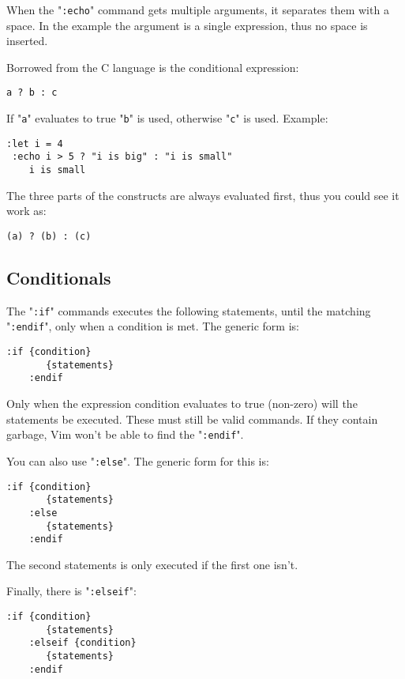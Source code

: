 When the "\verb!:echo!" command gets multiple arguments, it separates them with a space.
In the example the argument is a single expression, thus no space is inserted.

Borrowed from the C language is the conditional expression:

\begin{Verbatim}[samepage=true]
    a ? b : c
\end{Verbatim}

If "\verb!a!" evaluates to true "\verb!b!" is used, otherwise "\verb!c!" is used.
Example:

\begin{Verbatim}[samepage=true]
 :let i = 4
 :echo i > 5 ? "i is big" : "i is small"
    i is small
\end{Verbatim}

The three parts of the constructs are always evaluated first, thus you could see it work as:

\begin{Verbatim}[samepage=true]
    (a) ? (b) : (c)
\end{Verbatim}
\subsection{Conditionals}
The "\verb!:if!" commands executes the following statements, until the matching "\verb!:endif!", only when a condition is met.
The generic form is:

\begin{Verbatim}[samepage=true]
    :if {condition}
       {statements}
    :endif
\end{Verbatim}

Only when the expression {condition} evaluates to true (non-zero) will the {statements} be executed.
These must still be valid commands.
If they contain garbage, Vim won't be able to find the "\verb!:endif!".

You can also use "\verb!:else!".
The generic form for this is:

\begin{Verbatim}[samepage=true]
    :if {condition}
       {statements}
    :else
       {statements}
    :endif
\end{Verbatim}

The second {statements} is only executed if the first one isn't.

Finally, there is "\verb!:elseif!":

\begin{Verbatim}[samepage=true]
    :if {condition}
       {statements}
    :elseif {condition}
       {statements}
    :endif
\end{Verbatim}


